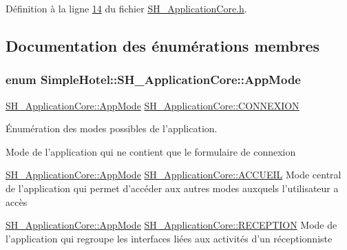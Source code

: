 Définition à la ligne \hyperlink{SH__ApplicationCore_8h_source_l00014}{14} du fichier \hyperlink{SH__ApplicationCore_8h_source}{S\-H\-\_\-\-Application\-Core.\-h}.



\subsection{Documentation des énumérations membres}
\hypertarget{classSimpleHotel_1_1SH__ApplicationCore_a5fea25d06c20cd22de5a2221c3a2dddc}{
\subsubsection[{App\-Mode}]{\setlength{\rightskip}{0pt plus 5cm}enum {\bf Simple\-Hotel\-::\-S\-H\-\_\-\-Application\-Core\-::\-App\-Mode}}}\label{classSimpleHotel_1_1SH__ApplicationCore_a5fea25d06c20cd22de5a2221c3a2dddc}


\hyperlink{classSimpleHotel_1_1SH__ApplicationCore_a5fea25d06c20cd22de5a2221c3a2dddc}{S\-H\-\_\-\-Application\-Core\-::\-App\-Mode} \hyperlink{classSimpleHotel_1_1SH__ApplicationCore_a5fea25d06c20cd22de5a2221c3a2dddcab28d722a9e532b8be780de474f2416b0}{S\-H\-\_\-\-Application\-Core\-::\-C\-O\-N\-N\-E\-X\-I\-O\-N} 

Énumération des modes possibles de l'application.

Mode de l'application qui ne contient que le formulaire de connexion

\hyperlink{classSimpleHotel_1_1SH__ApplicationCore_a5fea25d06c20cd22de5a2221c3a2dddc}{S\-H\-\_\-\-Application\-Core\-::\-App\-Mode} \hyperlink{classSimpleHotel_1_1SH__ApplicationCore_a5fea25d06c20cd22de5a2221c3a2dddca803d99a9521a4b887012d7533e13e0e1}{S\-H\-\_\-\-Application\-Core\-::\-A\-C\-C\-U\-E\-I\-L} Mode central de l'application qui permet d'accéder aux autres modes auxquels l'utilisateur a accès

\hyperlink{classSimpleHotel_1_1SH__ApplicationCore_a5fea25d06c20cd22de5a2221c3a2dddc}{S\-H\-\_\-\-Application\-Core\-::\-App\-Mode} \hyperlink{classSimpleHotel_1_1SH__ApplicationCore_a5fea25d06c20cd22de5a2221c3a2dddcade78cf47a182504c4e92b013969393bc}{S\-H\-\_\-\-Application\-Core\-::\-R\-E\-C\-E\-P\-T\-I\-O\-N} Mode de l'application qui regroupe les interfaces liées aux activités d'un réceptionniste

